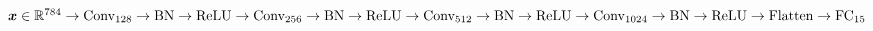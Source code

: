 $\vect{x} \in \real^{784} \newline
	\rightarrow \text{Conv}_{128} \rightarrow \text{BN} \rightarrow \text{ReLU} \newline
	\rightarrow \text{Conv}_{256} \rightarrow \text{BN} \rightarrow \text{ReLU} \newline
	\rightarrow \text{Conv}_{512} \rightarrow \text{BN} \rightarrow \text{ReLU} \newline
	\rightarrow \text{Conv}_{1024} \rightarrow \text{BN} \rightarrow \text{ReLU} \newline
	\rightarrow \text{Flatten} \rightarrow \text{FC}_{15}$